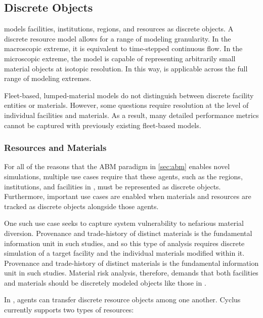 \subsection{Discrete Objects}

\Cyclus models facilities, institutions, regions, and resources as discrete
objects. A discrete resource model allows for a range of modeling granularity. In the
macroscopic extreme, it is equivalent to time-stepped continuous flow. In the
microscopic extreme, the model is capable of representing arbitrarily small
material objects at isotopic resolution. In this way, \Cyclus is
applicable across the full range of modeling extremes.

Fleet-based, lumped-material models do not distinguish between discrete
facility entities or materials. However, some questions require resolution at the level of
individual facilities and materials.
As a result, many detailed performance
metrics cannot be captured with previously existing fleet-based models.

\subsubsection{Resources and Materials}

For all of the reasons that the \gls{ABM} paradigm in \ref{sec:abm} enables
novel simulations, multiple use cases require that these agents, such as the
regions, institutions, and facilities in \Cyclus, must be represented as
discrete objects. Furthermore, important use cases are enabled when materials
and resources are tracked as discrete objects alongside those agents.

One such use case seeks to capture system vulnerability to nefarious
material diversion. Provenance and trade-history of distinct materials is the fundamental
information unit in such studies, and so this type of analysis requires
 discrete simulation of a
target facility and the individual materials modified within it.
Provenance and trade-history of distinct materials is the fundamental
information unit in such studies.
Material risk analysis, therefore, demands that both facilities and materials
should be discretely modeled objects like those in \Cyclus.


In \Cyclus, agents can transfer discrete resource objects among one another.
Cyclus currently supports two types of resources:

